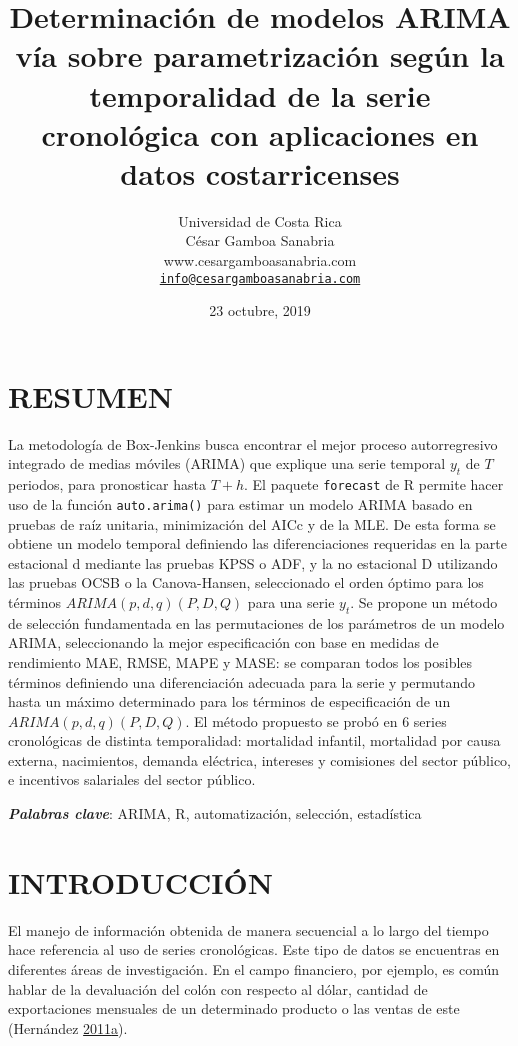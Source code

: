 \documentclass[]{article}
\title{Determinación de modelos ARIMA vía sobre parametrización según la
temporalidad de la serie cronológica con aplicaciones en datos
costarricenses}
\author{Universidad de Costa Rica\\
César Gamboa Sanabria\\
www.cesargamboasanabria.com\\
\href{mailto:info@cesargamboasanabria.com}{\nolinkurl{info@cesargamboasanabria.com}}}
\date{23 octubre, 2019}
\begin{document}
\maketitle

\newpage

\section*{RESUMEN}

La metodología de Box-Jenkins busca encontrar el mejor proceso
autorregresivo integrado de medias móviles (ARIMA) que explique una
serie temporal \(y_t\) de \(T\) periodos, para pronosticar hasta
\(T+h\). El paquete \texttt{forecast} de R permite hacer uso de la
función \texttt{auto.arima()} para estimar un modelo ARIMA basado en
pruebas de raíz unitaria, minimización del AICc y de la MLE. De esta
forma se obtiene un modelo temporal definiendo las diferenciaciones
requeridas en la parte estacional d mediante las pruebas KPSS o ADF, y
la no estacional D utilizando las pruebas OCSB o la Canova-Hansen,
seleccionado el orden óptimo para los términos \(ARIMA(p,d,q)(P,D,Q)\)
para una serie \(y_t\). Se propone un método de selección fundamentada
en las permutaciones de los parámetros de un modelo ARIMA, seleccionando
la mejor especificación con base en medidas de rendimiento MAE, RMSE,
MAPE y MASE: se comparan todos los posibles términos definiendo una
diferenciación adecuada para la serie y permutando hasta un máximo
determinado para los términos de especificación de un
\(ARIMA(p,d,q)(P,D,Q)\). El método propuesto se probó en 6 series
cronológicas de distinta temporalidad: mortalidad infantil, mortalidad
por causa externa, nacimientos, demanda eléctrica, intereses y
comisiones del sector público, e incentivos salariales del sector
público.

\textbf{\emph{Palabras clave}}: ARIMA, R, automatización, selección,
estadística

\newpage

\tableofcontents

\newpage

\section{INTRODUCCIÓN}

El manejo de información obtenida de manera secuencial a lo largo del
tiempo hace referencia al uso de series cronológicas. Este tipo de datos
se encuentras en diferentes áreas de investigación. En el campo
financiero, por ejemplo, es común hablar de la devaluación del colón con
respecto al dólar, cantidad de exportaciones mensuales de un determinado
producto o las ventas de este (Hernández
\protect\hyperlink{ref-oscarh-1}{2011}\protect\hyperlink{ref-oscarh-1}{a}).
\end{document}
